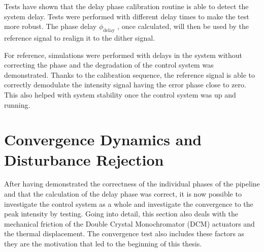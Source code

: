 Tests have shown that the delay phase calibration routine is able to detect the system delay. Tests were performed with different delay times to make the test more robust.
The phase delay $\phi_{\text{delay}}$ , once calculated, will then be used by the reference signal to realign it to the dither signal.

For reference, simulations were performed with delays in the system without correcting the phase and the degradation of the control system was demonstrated.
Thanks to the calibration sequence, the reference signal is able to correctly demodulate the intensity signal having the error phase close to zero.
This also helped with system stability once the control system was up and running.

\section{Convergence Dynamics and Disturbance Rejection}

After having demonstrated the correctness of the individual phases of the pipeline and that the calculation of the delay phase was correct, it is now possible to investigate the control system as a whole and investigate the convergence to the peak intensity by testing.
Going into detail, this section also deals with the mechanical friction of the Double Crystal Monochromator (DCM) actuators and the thermal displacement.
The convergence test also includes these factors as they are the motivation that led to the beginning of this thesis.

